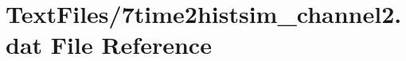 \hypertarget{7time2histsim__channel2_8dat}{}\section{Text\+Files/7time2histsim\+\_\+channel2.dat File Reference}
\label{7time2histsim__channel2_8dat}
